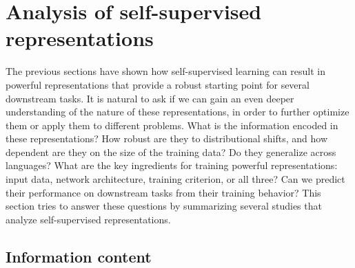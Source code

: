 
\section{Analysis of self-supervised representations}
\label{analysis}

The previous sections have shown how self-supervised learning can result in
powerful representations that provide a robust starting point for several
downstream tasks. It is natural to ask if we can gain an even deeper
understanding of the nature of these representations, in order to further
optimize them or apply them to different problems.
What is the information encoded in these representations? How robust are they
to distributional shifts, and how dependent are they on the size of the
training data? Do they generalize across languages? What are the key
ingredients for training powerful representations: input data, network
architecture, training criterion, or all three? Can we predict their
performance on downstream tasks from their training behavior? This section
tries to answer these questions by summarizing several studies that analyze
self-supervised representations.

\subsection{Information content}

